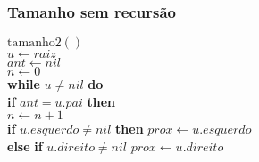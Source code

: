 \documentclass{beamer}
\begin{document}
\begin{frame}[shrink]
\frametitle{Tamanho sem recursão}
\begin{oframed}
\begin{flushleft}
\hspace*{1em} \ensuremath{\mathrm{tamanho2}()}\\
\hspace*{1em} \hspace*{1em} \ensuremath{\ensuremath{\mathit{u}} \gets  \ensuremath{raiz}}\\
\hspace*{1em} \hspace*{1em} \ensuremath{\ensuremath{\mathit{ant}} \gets  \ensuremath{nil}}\\
\hspace*{1em} \hspace*{1em} \ensuremath{\ensuremath{\mathit{n}} \gets  \ensuremath{0}}\\
\hspace*{1em} \hspace*{1em} {\color{black} \textbf{while}} \ensuremath{\ensuremath{\mathit{u}} \ne nil} {\color{black} \textbf{do}} \\
\hspace*{1em} \hspace*{1em} \hspace*{1em} {\color{black} \textbf{if}} \ensuremath{\ensuremath{\mathit{ant}} = \ensuremath{\mathit{u}}.pai} {\color{black} \textbf{then}} \\
\hspace*{1em} \hspace*{1em} \hspace*{1em} \hspace*{1em} \ensuremath{\ensuremath{\mathit{n}} \gets  \ensuremath{\ensuremath{\mathit{n}} + 1}}\\
\hspace*{1em} \hspace*{1em} \hspace*{1em} \hspace*{1em} {\color{black} \textbf{if}} \ensuremath{\ensuremath{\mathit{u}}.\ensuremath{\mathit{esquerdo}} \ne nil} {\color{black} \textbf{then}}  \ensuremath{\ensuremath{\mathit{prox}} \gets  \ensuremath{\ensuremath{\mathit{u}}.esquerdo}}\\
\hspace*{1em} \hspace*{1em} \hspace*{1em} \hspace*{1em} {\color{black} \textbf{else}} {\color{black} \textbf{if}} \ensuremath{\ensuremath{\mathit{u}}.\ensuremath{\mathit{direito}} \ne nil} \ensuremath{\ensuremath{\mathit{prox}} \gets  \ensuremath{\ensuremath{\mathit{u}}.direito}}\\

\end{flushleft}
\end{oframed}
\end{frame}
\end{document}

